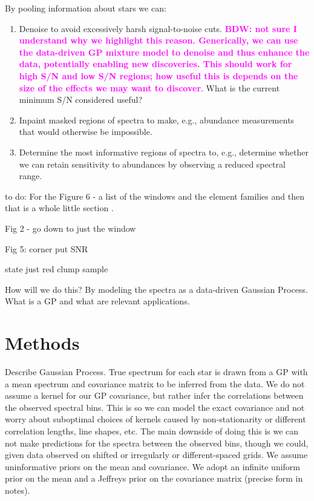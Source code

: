\documentclass[a4paper,fleqn,usenatbib]{mnras}
\newcommand{\bdw}[1]{\textbf{\textcolor{magenta}{BDW: #1}}}
\begin{document}
By pooling information about stars we can:
\begin{enumerate}
\item Denoise to avoid excessively harsh signal-to-noise cuts. \bdw{not sure I understand why we highlight this reason. Generically, we can use the data-driven GP mixture model to denoise and thus enhance the data, potentially enabling new discoveries. This should work for high S/N and low S/N regions; how useful this is depends on the size of the effects we may want to discover}. What is the current minimum S/N considered useful?
\item Inpaint masked regions of spectra to make, e.g., abundance measurements that would otherwise be impossible.
\item Determine the most informative regions of spectra to, e.g., determine whether we can retain sensitivity to abundances by observing a reduced spectral range.
\end{enumerate}

to do: For the Figure 6 - a list of the windows and the element families and then that is a whole little section . 

Fig 2 - go down to just the window

Fig 5: corner put SNR 

state just red clump sample 

How will we do this? By modeling the spectra as a data-driven Gaussian Process. What is a GP and what are relevant applications.


\section{Methods}

Describe Gaussian Process. True spectrum for each star is drawn from a GP with a mean spectrum and covariance matrix to be inferred from the data. We do not assume a kernel for our GP covariance, but rather infer the correlations between the observed spectral bins. This is so we can model the exact covariance and not worry about suboptimal choices of kernels caused by non-stationarity or different correlation lengths, line shapes, etc. The main downside of doing this is we can not make predictions for the spectra between the observed bins, though we could, given data observed on shifted or irregularly or different-spaced grids. We assume uninformative priors on the mean and covariance. We adopt an infinite uniform prior on the mean and a Jeffreys prior on the covariance matrix (precise form in notes).
\end{document}
